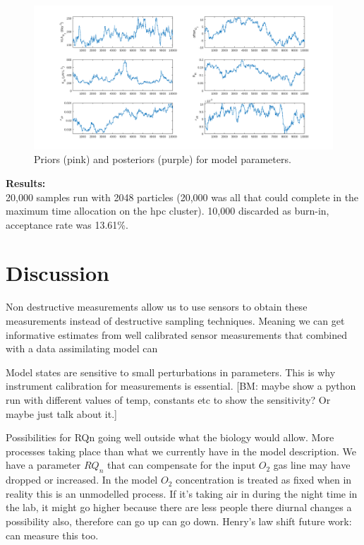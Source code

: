 \documentclass{ruthesis}
\begin{document}
\begin{figure}
	\centerline{\includegraphics[width=1.3\textwidth]{images_microalgae/plots_chris_offset_thinned/modelparameters1_trace}}
	\caption[.]{Priors (pink) and posteriors (purple) for model parameters.}
	\label{fig:micro_exp_test_parameters_model_trace}
\end{figure}


\textbf{Results:}\\
20,000 samples run with 2048 particles (20,000 was all that could complete in the maximum time allocation on the hpc cluster). 10,000 discarded as burn-in, acceptance rate was 13.61\%.






\FloatBarrier
\section{Discussion}

Non destructive measurements allow us to use sensors to obtain these measurements instead of destructive sampling techniques. Meaning we can get informative estimates from well calibrated sensor measurements that combined with a data assimilating model can 



Model states are sensitive to small perturbations in parameters. This is why instrument calibration for measurements is essential. [BM: maybe show a python run with different values of temp, constants etc to show the sensitivity? Or maybe just talk about it.] 


Possibilities for RQn going well outside what the biology would allow. 
More processes taking place than what we currently have in the model description. We have a parameter $RQ_n$ that can compensate for the input $O_2$ gas line may have dropped or increased.
In the model $O_2$ concentration is treated as fixed when in reality this is an unmodelled process. If it's taking air in during the night time in the lab, it might go higher because there are less people there 
diurnal changes a possibility also, therefore can go up can go down.
Henry's law shift 
future work: can measure this too.
\end{document}
